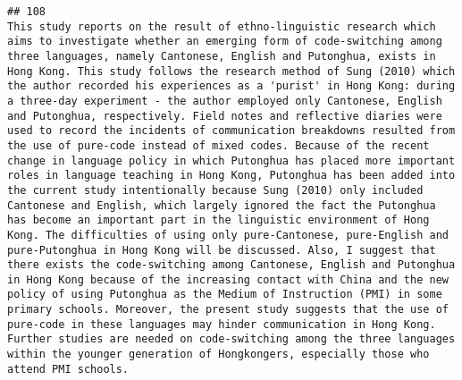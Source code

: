 \documentclass[
  english,
  man]{apa6}
\begin{document}
\begin{verbatim}
## 108                                                                                                                                                                                                                                                                                                                                                                                                                                                                                                                                                                                                                                                                                                                                                                                                                                                                                                                                                                                                This study reports on the result of ethno-linguistic research which aims to investigate whether an emerging form of code-switching among three languages, namely Cantonese, English and Putonghua, exists in Hong Kong. This study follows the research method of Sung (2010) which the author recorded his experiences as a 'purist' in Hong Kong: during a three-day experiment - the author employed only Cantonese, English and Putonghua, respectively. Field notes and reflective diaries were used to record the incidents of communication breakdowns resulted from the use of pure-code instead of mixed codes. Because of the recent change in language policy in which Putonghua has placed more important roles in language teaching in Hong Kong, Putonghua has been added into the current study intentionally because Sung (2010) only included Cantonese and English, which largely ignored the fact the Putonghua has become an important part in the linguistic environment of Hong Kong. The difficulties of using only pure-Cantonese, pure-English and pure-Putonghua in Hong Kong will be discussed. Also, I suggest that there exists the code-switching among Cantonese, English and Putonghua in Hong Kong because of the increasing contact with China and the new policy of using Putonghua as the Medium of Instruction (PMI) in some primary schools. Moreover, the present study suggests that the use of pure-code in these languages may hinder communication in Hong Kong. Further studies are needed on code-switching among the three languages within the younger generation of Hongkongers, especially those who attend PMI schools.

\end{verbatim}
\end{document}
